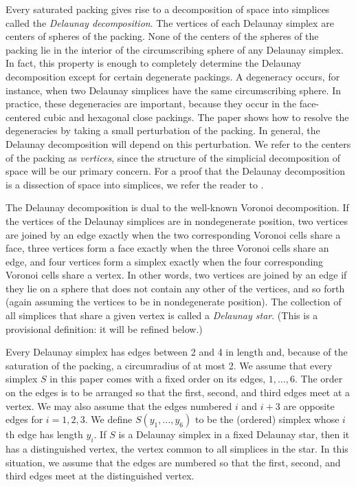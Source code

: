 Every saturated packing gives rise to a decomposition of space into
simplices called the {\it Delaunay decomposition}.  The vertices
of each Delaunay simplex are centers of spheres of the packing.  
None of the centers
of the spheres of the packing lie in the interior of the circumscribing
sphere of any Delaunay simplex.  
In fact, this property is enough to
completely determine the Delaunay decomposition except for
certain degenerate packings.  A degeneracy occurs,
for instance, when two Delaunay simplices have the same circumscribing
sphere.  In practice, these degeneracies are important, because they
occur in the face-centered cubic and hexagonal close packings.
The paper \cite{H2} shows how to resolve the degeneracies by taking a
small perturbation of the packing.  In general, the
Delaunay decomposition will depend on this perturbation.
We refer to the centers of the packing as {\it vertices\/},
since the structure of the simplicial
decomposition of space will be our primary concern.
For a proof that the Delaunay decomposition is a dissection of space
into simplices, we refer the reader to \cite{R}.

The Delaunay decomposition is dual to the well-known Voronoi
decomposition.  
If the vertices of the Delaunay simplices are in nondegenerate
position, two vertices are joined by an edge exactly when
the two corresponding Voronoi cells share a face, three vertices
form a face exactly when the three Voronoi cells share an edge, and
four vertices form a simplex exactly when the four corresponding
Voronoi cells share a vertex.  In other words, two vertices are
joined by an edge if they lie on a sphere that does not contain
any other of the vertices, and so forth (again assuming the vertices
to be in nondegenerate position).  The collection of all simplices that
share a given vertex is called a {\it Delaunay star}.  (This is
a provisional definition: it will
be refined below.)


Every Delaunay simplex has
edges between 2 and 4 in length and, because of the saturation
of the packing,  a circumradius of at
most 2. 
We assume that every simplex $S$ in this paper comes with a fixed
order on its edges, $1,\ldots,6$. 
The order on the edges is to be arranged so that
the first, second, and third edges meet at a vertex.  We may
also assume that the edges numbered $i$ and $i+3$ are opposite
edges for $i=1,2,3$.  We define $S(y_1,\ldots,y_6)$ to be
the (ordered) simplex whose $i$th edge has length $y_i$.
If $S$ is a Delaunay simplex in a fixed Delaunay star, then
it has a distinguished vertex, the vertex common to all simplices
in the star.  In this situation, we assume that the edges
are numbered so that the first, second, and third edges meet
at the distinguished vertex.

